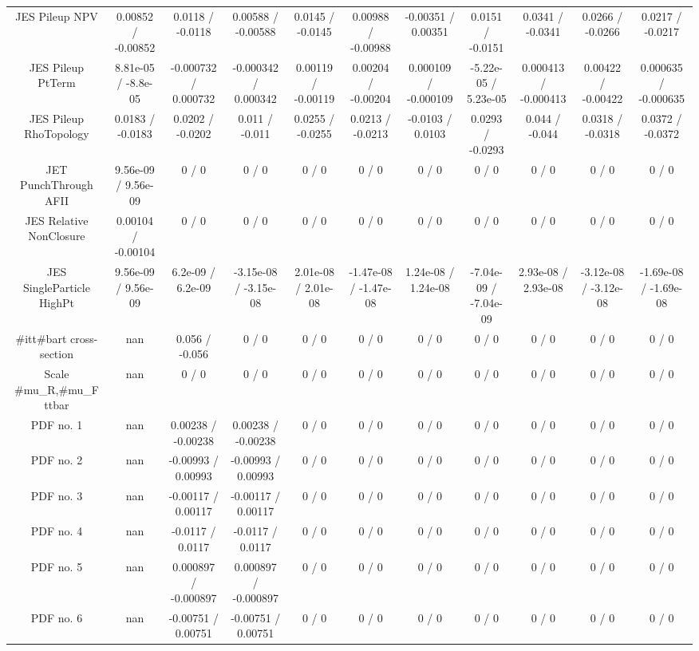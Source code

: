 \begin{table}[htbp]
\begin{center}
\begin{tabular}{|c|c|c|c|c|c|c|c|c|c|c|}
  JES Pileup NPV & 0.00852 / -0.00852 & 0.0118 / -0.0118 & 0.00588 / -0.00588 & 0.0145 / -0.0145 & 0.00988 / -0.00988 & -0.00351 / 0.00351 & 0.0151 / -0.0151 & 0.0341 / -0.0341 & 0.0266 / -0.0266 & 0.0217 / -0.0217 \\ 
  JES Pileup PtTerm & 8.81e-05 / -8.8e-05 & -0.000732 / 0.000732 & -0.000342 / 0.000342 & 0.00119 / -0.00119 & 0.00204 / -0.00204 & 0.000109 / -0.000109 & -5.22e-05 / 5.23e-05 & 0.000413 / -0.000413 & 0.00422 / -0.00422 & 0.000635 / -0.000635 \\ 
  JES Pileup RhoTopology & 0.0183 / -0.0183 & 0.0202 / -0.0202 & 0.011 / -0.011 & 0.0255 / -0.0255 & 0.0213 / -0.0213 & -0.0103 / 0.0103 & 0.0293 / -0.0293 & 0.044 / -0.044 & 0.0318 / -0.0318 & 0.0372 / -0.0372 \\ 
  JET PunchThrough AFII & 9.56e-09 / 9.56e-09 & 0 / 0 & 0 / 0 & 0 / 0 & 0 / 0 & 0 / 0 & 0 / 0 & 0 / 0 & 0 / 0 & 0 / 0 \\ 
  JES Relative NonClosure & 0.00104 / -0.00104 & 0 / 0 & 0 / 0 & 0 / 0 & 0 / 0 & 0 / 0 & 0 / 0 & 0 / 0 & 0 / 0 & 0 / 0 \\ 
  JES SingleParticle HighPt & 9.56e-09 / 9.56e-09 & 6.2e-09 / 6.2e-09 & -3.15e-08 / -3.15e-08 & 2.01e-08 / 2.01e-08 & -1.47e-08 / -1.47e-08 & 1.24e-08 / 1.24e-08 & -7.04e-09 / -7.04e-09 & 2.93e-08 / 2.93e-08 & -3.12e-08 / -3.12e-08 & -1.69e-08 / -1.69e-08 \\ 
  #it{t#bar{t}} cross-section &    nan    & 0.056 / -0.056 & 0 / 0 & 0 / 0 & 0 / 0 & 0 / 0 & 0 / 0 & 0 / 0 & 0 / 0 & 0 / 0 \\ 
  Scale #mu_{R},#mu_{F} ttbar &    nan    & 0 / 0 & 0 / 0 & 0 / 0 & 0 / 0 & 0 / 0 & 0 / 0 & 0 / 0 & 0 / 0 & 0 / 0 \\ 
  PDF no. 1 &    nan    & 0.00238 / -0.00238 & 0.00238 / -0.00238 & 0 / 0 & 0 / 0 & 0 / 0 & 0 / 0 & 0 / 0 & 0 / 0 & 0 / 0 \\ 
  PDF no. 2 &    nan    & -0.00993 / 0.00993 & -0.00993 / 0.00993 & 0 / 0 & 0 / 0 & 0 / 0 & 0 / 0 & 0 / 0 & 0 / 0 & 0 / 0 \\ 
  PDF no. 3 &    nan    & -0.00117 / 0.00117 & -0.00117 / 0.00117 & 0 / 0 & 0 / 0 & 0 / 0 & 0 / 0 & 0 / 0 & 0 / 0 & 0 / 0 \\ 
  PDF no. 4 &    nan    & -0.0117 / 0.0117 & -0.0117 / 0.0117 & 0 / 0 & 0 / 0 & 0 / 0 & 0 / 0 & 0 / 0 & 0 / 0 & 0 / 0 \\ 
  PDF no. 5 &    nan    & 0.000897 / -0.000897 & 0.000897 / -0.000897 & 0 / 0 & 0 / 0 & 0 / 0 & 0 / 0 & 0 / 0 & 0 / 0 & 0 / 0 \\ 
  PDF no. 6 &    nan    & -0.00751 / 0.00751 & -0.00751 / 0.00751 & 0 / 0 & 0 / 0 & 0 / 0 & 0 / 0 & 0 / 0 & 0 / 0 & 0 / 0 \\ 

\end{tabular}
\end{center}
\end{table}

